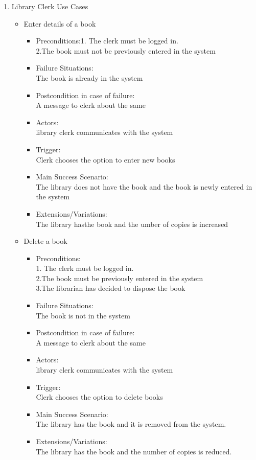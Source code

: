 \documentclass[a4paper]{article}
\begin{document}
\begin{enumerate}
\item Library Clerk Use Cases
 \begin{itemize}
 \item Enter details of a book
 \begin{itemize}
 \item Preconditions:1. The clerk must be logged in.\\2.The book must not be previously entered in the system
 \item Failure Situations:\\ The book is already in the system
 \item Postcondition in case of failure:\\A message to clerk about the same
 \item Actors:\\ library clerk communicates with the system
 \item Trigger:\\ Clerk chooses the option to enter new books
 \item Main Success Scenario:\\ The library  does not have the book and the book is newly entered in the system
\item  Extensions/Variations:\\ The library hasthe book and the umber of copies is increased
\end{itemize}
 \item Delete a book 
 \begin{itemize}
	\item 	Preconditions:\\1. The clerk must be logged in.\\2.The book must  be previously entered in the system \\3.The librarian has decided to dispose the book\\
 \item Failure Situations:\\ The book is not in the system\\
 \item Postcondition in case of failure:\\A message to clerk about the same\\
 \item Actors:\\ library clerk communicates with the system\\
 \item Trigger:\\ Clerk chooses the option to delete books\\
 \item Main Success Scenario:\\ The library  has the book and it is removed from the system.\\
 \item Extensions/Variations: \\The library has the book and the number of copies is reduced.\\
 

\end{itemize}
\end{itemize}
\end{enumerate}
\end{document}
